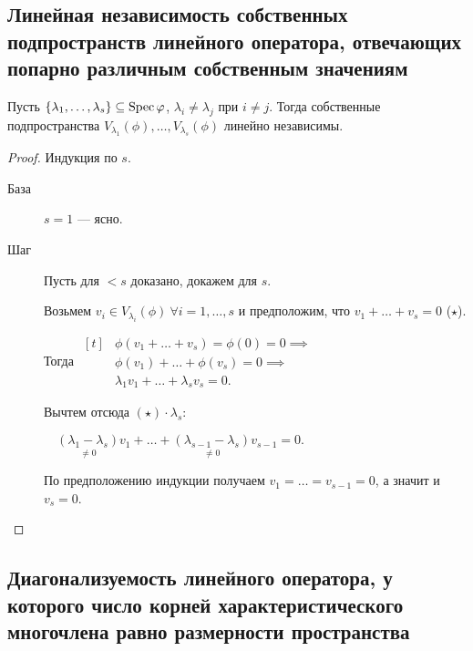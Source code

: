 \subsection{Линейная независимость собственных подпространств линейного оператора, отвечающих попарно различным собственным значениям}

\begin{proposal}
    Пусть $ \{\lambda_1, \dots, \lambda_s\} \subseteq \operatorname{\mathop{\mathrm{Spec}}} \varphi$, $\lambda_i \neq \lambda_j$ при $i \neq j$. Тогда собственные подпространства $V_{\lambda_1}(\phi), \dots, V_{\lambda_s}(\phi)$ линейно независимы.
\end{proposal}

\begin{proof}
    Индукция по $s$.
    \begin{description}
    \item[База] $s = 1$ --- ясно.
    \item[Шаг] Пусть для $< s$ доказано, докажем для $s$.

        Возьмем $v_i \in V_{\lambda_i}(\phi) \ \forall i = 1, \dots, s$ и предположим, что $v_1 + \dots + v_s = 0$ ($\star$).

        Тогда 
        \begin{math}
            \begin{aligned}[t]
                &\phi(v_1 + \dots + v_s) = \phi(0) = 0 \implies \\ 
                &\phi(v_1) + \dots + \phi(v_s) = 0 \implies \\
                &\lambda_1 v_1 + \dots + \lambda_s v_s = 0.
            \end{aligned}
        \end{math}

        Вычтем отсюда $(\star) \cdot \lambda_s$:

        \begin{math}
            \quad \underset{\neq 0}{(\lambda_1 - \lambda_s)} v_1 + \dots + \underset{\neq 0}{(\lambda_{s - 1} - \lambda_s)} v_{s - 1} = 0.
        \end{math}

        По предположению индукции получаем $v_1 = \dots = v_{s - 1} = 0$, а значит и $v_s = 0$.
        \qedhere
    \end{description}
\end{proof}


\subsection{Диагонализуемость линейного оператора, у которого число корней характеристического многочлена равно размерности пространства}

